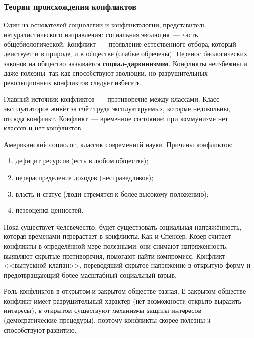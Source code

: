 \documentclass[12pt]{article}
\begin{document}
	\subsubsection{Теории происхождения конфликтов}

	\begin{person}
		Один из основателей социологии и конфликтологии, представитель натуралистического направления: социальная эволюция~--- часть общебиологической. Конфликт~--- проявление естественного отбора, который действует и в природе, и в обществе (слабые обречены). Перенос биологических законов на общество называется \textbf{социал-дарвинизмом}. Конфликты неизбежны и даже полезны, так как способствуют эволюции, но разрушительных революционных конфликтов следует избегать.
	\end{person}

	\begin{person}[Марксисты]
		Главный источник конфликтов~--- противоречие между классами. Класс эксплуататоров живёт за счёт труда эксплуатируемых, которые недовольны, отсюда конфликт. Конфликт~--- временное состояние: при коммунизме нет классов и нет конфликтов.
	\end{person}

	\begin{person}
		Американский социолог, классик современной науки. Причины конфликтов:
		\begin{enumerate}
			\item дефицит ресурсов (есть в любом обществе);
			\item перераспределение доходов (несправедливое);
			\item власть и статус (люди стремятся к более высокому положению);
			\item переоценка ценностей.
		\end{enumerate}
		Пока существует человечество, будет существовать социальная напряжённость, которая временами перерастает в конфликты. Как и Спенсер, Козер считает конфликты в определённой мере полезными: они снимают напряжённость, выявляют скрытые противоречия, помогают найти компромисс. Конфликт~--- <<выпускной клапан>>, переводящий скрытое напряжение в открытую форму и предотвращающий более масштабный социальный взрыв.

		Роль конфликтов в открытом и закрытом обществе разная. В закрытом обществе конфликт имеет разрушительный характер (нет возможности открыто выразить интересы), в открытом существуют механизмы защиты интересов (демократические процедуры), поэтому конфликты скорее полезны и способствуют развитию.
	\end{person}
\end{document}

